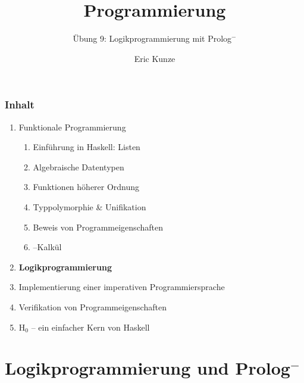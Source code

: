 \documentclass{beamer}
\begin{document}
	
	\title{Programmierung}
	\subtitle{Übung 9: Logikprogrammierung mit Prolog${}^-$}
	\author{Eric Kunze}
	\date{}
	
	\maketitle
	


\begin{frame}[fragile] \frametitle{Inhalt}
	\begin{enumerate}
		\item Funktionale Programmierung
		\begin{enumerate}
			\item Einführung in Haskell: Listen
			\item Algebraische Datentypen
			\item Funktionen höherer Ordnung
			\item Typpolymorphie \& Unifikation
			\item Beweis von Programmeigenschaften
			\item \textlambda--Kalkül
		\end{enumerate}
		\item \textbf{Logikprogrammierung}
		\item Implementierung einer imperativen Programmiersprache
		\item Verifikation von Programmeigenschaften
		\item H${}_\text{0}$ -- ein einfacher Kern von Haskell
	\end{enumerate}
\end{frame}


\section{Logikprogrammierung und Prolog${}^-$}




\end{document}
